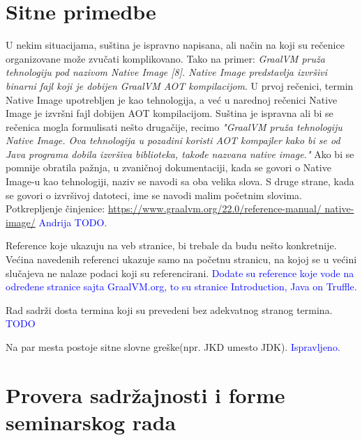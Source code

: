 \documentclass[a4paper]{report}
\newcommand{\odgovor}[1]{\textcolor{blue}{#1}}
\begin{document}
\section{Sitne primedbe}
U nekim situacijama, suština je ispravno napisana, ali način na koji su rečenice organizovane može zvučati komplikovano. Tako na primer: 
\textit{GraalVM pruža tehnologiju pod nazivom Native Image [8]. Native Image predstavlja izvršivi binarni fajl koji je dobijen GraalVM AOT 
kompilacijom}. U prvoj rečenici, termin Native Image upotrebljen je kao tehnologija, a već u narednoj rečenici Native Image je izvršni fajl 
dobijen AOT kompilacijom. Suština je ispravna ali bi se rečenica mogla formulisati nešto drugačije, recimo \textit{"GraalVM pruža tehnologiju 
Native Image. Ova tehnologija u pozadini koristi AOT kompajler kako bi se od Java programa dobila izvršiva biblioteka, takođe nazvana native 
image."} Ako bi se pomnije obratila pažnja, u zvaničnoj dokumentaciji, kada se govori o Native Image-u kao tehnologiji, naziv se navodi sa oba 
velika slova. S druge strane, kada se govori o izvršivoj datoteci, ime se navodi malim početnim slovima. 
Potkrepljenje činjenice: \href{https://www.graalvm.org/22.0/reference-manual/native-image/}{https://www.graalvm.org/22.0/reference-manual/
native-image/} \odgovor{Andrija TODO.}

\indent Reference koje ukazuju na veb stranice, bi trebale da budu nešto konkretnije. Većina navedenih referenci ukazuje samo na početnu stranicu, na kojoj se u većini slučajeva ne nalaze podaci koji su referencirani.  \odgovor{Dodate su reference koje vode na određene stranice sajta GraalVM.org, to su stranice Introduction, Java on Truffle.}

\indent Rad sadrži dosta termina koji su prevedeni bez adekvatnog stranog termina. \odgovor{TODO}

\indent Na par mesta postoje sitne slovne greške(npr. JKD umesto JDK). \odgovor{Ispravljeno.}

\section{Provera sadržajnosti i forme seminarskog rada}
\end{document}
